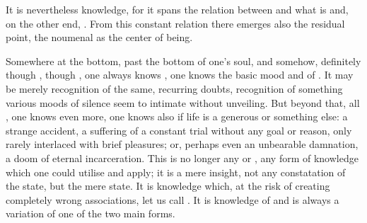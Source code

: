 It is nevertheless knowledge, for it spans the relation between  and what
is  and, on the other end, . From this constant relation
there emerges also the residual point, the noumenal  as the center of
 being.

\inv %
%
Somewhere at the bottom, past the bottom of one's soul, and somehow, definitely
though ,  though , one always knows
, one knows the basic mood and  of .  It
may be merely recognition of the same, recurring doubts, recognition of
something various moods of silence seem to intimate without unveiling.  But
beyond that,  all , one knows even more, one knows
also if life is a generous  or something else: a strange accident, a
suffering of a constant trial without any goal or reason, only rarely interlaced
with brief pleasures; or, perhaps even an unbearable damnation, a doom of
eternal incarceration. This is no longer any  or , any
form of knowledge which one could utilise and apply; it is a mere insight, not
any  constatation of the state, but the mere state. It is
 knowledge which, at the risk of creating completely wrong
associations, let us call . It is knowledge of  and is
always a variation of one of the two main forms.

